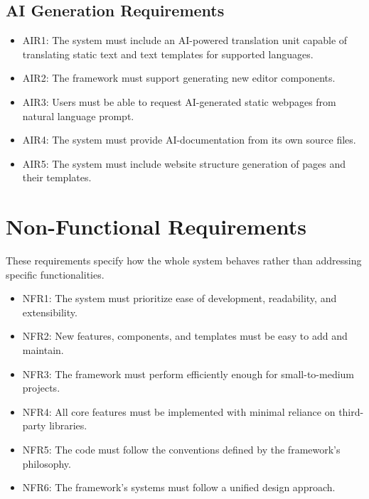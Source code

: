 \subsection*{AI Generation Requirements}\label{subsec:ai-generation-requirements}
\begin{itemize}
    \item AIR1: The system must include an AI-powered translation unit capable of translating static text and text templates for supported languages.
    \item AIR2: The framework must support generating new editor components.
    \item AIR3: Users must be able to request AI-generated static webpages from natural language prompt.
    \item AIR4: The system must provide AI-documentation from its own source files.
    \item AIR5: The system must include website structure generation of pages and their templates.
\end{itemize}

\section{Non-Functional Requirements}\label{sec:non-functional-requirements}
These requirements specify how the whole system behaves rather than addressing specific functionalities.

\begin{itemize}
    \item NFR1: The system must prioritize ease of development, readability, and extensibility.
    \item NFR2: New features, components, and templates must be easy to add and maintain.
    \item NFR3: The framework must perform efficiently enough for small-to-medium projects.
    \item NFR4: All core features must be implemented with minimal reliance on third-party libraries.
    \item NFR5: The code must follow the conventions defined by the framework’s philosophy.
    \item NFR6: The framework's systems must follow a unified design approach.
\end{itemize}
